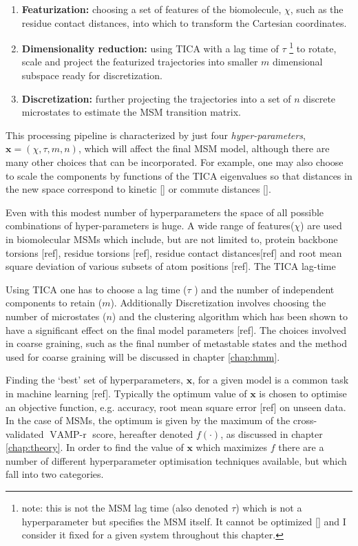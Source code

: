 \begin{enumerate}
    \item \textbf{Featurization:} choosing a set of features of the biomolecule, $\chi$, such as the residue contact distances, into which to transform the Cartesian coordinates.  
    \item \textbf{Dimensionality reduction:} using  TICA with a lag time of $\tau$ \footnote{note: this is not the MSM lag time (also denoted $\tau$) which is not a hyperparameter but specifies the MSM itself. It cannot be optimized [] and I consider it fixed for a given system throughout this chapter.} to rotate, scale and project the featurized trajectories into smaller $m$ dimensional subspace ready for discretization.  
    \item \textbf{Discretization:} further projecting the trajectories into a set of $n$ discrete microstates to estimate the MSM transition matrix. 
\end{enumerate}
This processing pipeline is characterized by just four \emph{hyper-parameters}, $\mathbf{x} = (\chi, \tau, m, n)$, which will affect the final MSM model, although there are many other choices that can be incorporated. For example, one may also choose to scale the components by functions of the TICA eigenvalues so that distances in the new space correspond to kinetic [] or commute distances []. 

Even with this modest number of hyperparameters the space of all possible combinations of hyper-parameters is huge. A wide range of features($\chi$) are used in biomolecular MSMs which include, but are not limited to, protein backbone torsions [ref], residue torsions [ref], residue contact distances[ref] and root mean square deviation of various subsets of atom positions [ref]. The TICA lag-time


Using TICA one has to choose a lag time ($\tau$ ) and the number of independent components to retain ($m$). Additionally  Discretization involves choosing the number of microstates ($n$) and the clustering algorithm which has been shown to have a significant effect on the final model parameters [ref].  The choices involved in coarse graining, such as the final number of metastable states and the method used for coarse graining will be discussed in chapter \ref{chap:hmm}. 

Finding the `best' set of hyperparameters, $\mathbf{x}$, for a given model is a common task in machine learning [ref]. Typically the optimum value of $\mathbf{x}$ is chosen to optimise an objective function, e.g. accuracy, root mean square error [ref] on unseen data. In the case of MSMs, the optimum is given by the maximum of the cross-validated $\operatorname{VAMP-r}$ score, hereafter denoted $f(\cdot)$, as discussed in chapter \ref{chap:theory}. In order to find the value of $\mathbf{x}$ which maximizes $f$ there are a number of different hyperparameter optimisation techniques available, but which fall into two categories. 

